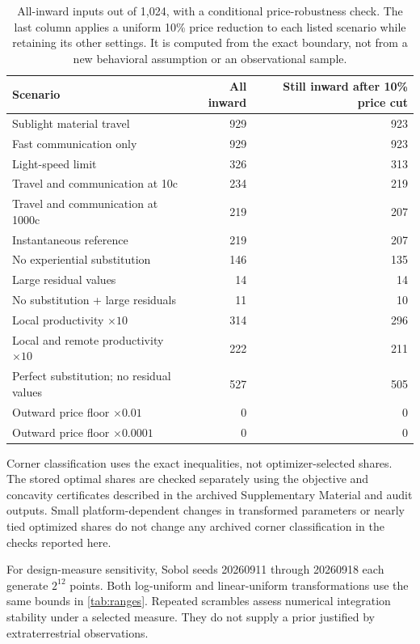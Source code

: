 \begin{table}[htbp]
\centering\small
\caption{All-inward inputs out of 1,024, with a conditional price-robustness check. The last column applies a uniform 10\% price reduction to each listed scenario while retaining its other settings. It is computed from the exact boundary, not from a new behavioral assumption or an observational sample.}
\label{tab:scenarios}

\begin{tabularx}{\textwidth}{@{}Xrr@{}}
\toprule
Scenario & All inward & Still inward after 10\% price cut \\
\midrule
Sublight material travel & 929 & 923 \\
Fast communication only & 929 & 923 \\
Light-speed limit & 326 & 313 \\
Travel and communication at 10c & 234 & 219 \\
Travel and communication at 1000c & 219 & 207 \\
Instantaneous reference & 219 & 207 \\
No experiential substitution & 146 & 135 \\
Large residual values & 14 & 14 \\
No substitution + large residuals & 11 & 10 \\
Local productivity $\times10$ & 314 & 296 \\
Local and remote productivity $\times10$ & 222 & 211 \\
Perfect substitution; no residual values & 527 & 505 \\
Outward price floor $\times0.01$ & 0 & 0 \\
Outward price floor $\times0.0001$ & 0 & 0 \\
\bottomrule
\end{tabularx}


\end{table}

Corner classification uses the exact inequalities, not optimizer-selected shares. The stored optimal shares are checked separately using the objective and concavity certificates described in the archived Supplementary Material and audit outputs. Small platform-dependent changes in transformed parameters or nearly tied optimized shares do not change any archived corner classification in the checks reported here.

For design-measure sensitivity, Sobol seeds 20260911 through 20260918 each generate $2^{12}$ points. Both log-uniform and linear-uniform transformations use the same bounds in \cref{tab:ranges}. Repeated scrambles assess numerical integration stability under a selected measure. They do not supply a prior justified by extraterrestrial observations.


